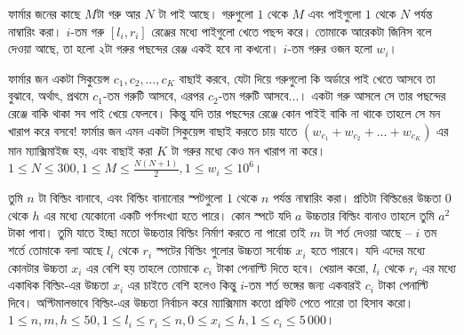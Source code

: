\begin{example}[\href{http://www.usaco.org/index.php?page=viewproblem2&%
  cpid=972}{USACO - Greedy Pie Eaters}]
  ফার্মার জনের কাছে $M$টা গরু আর $N$ টা পাই আছে। গরুগুলো $1$ থেকে $M$ এবং
  পাইগুলো $1$ থেকে $N$ পর্যন্ত নাম্বারিং করা। $i$-তম গরু $[l_i, r_i]$ রেঞ্জের
  মধ্যে পাইগুলো খেতে পছন্দ করে। তোমাকে আরেকটা জিনিস বলে দেওয়া আছে, তা হলো ২টা
  গরুর পছন্দের রেঞ্জ একই হবে না কখনো। $i$-তম গরুর ওজন হলো $w_i$।

  \noindent ফার্মার জন একটা সিকুয়েন্স $c_1, c_2, \ldots, c_K$ বাছাই করবে,
  যেটা দিয়ে গরুগুলো কি অর্ডারে পাই খেতে আসবে তা বুঝাবে, অর্থাৎ, প্রথমে
  $c_1$-তম গরুটি আসবে, এরপর $c_2$-তম গরুটি আসবে...। একটা গরু আসলে সে তার
  পছন্দের রেঞ্জে বাকি থাকা সব পাই খেয়ে ফেলবে। কিন্তু যদি তার পছন্দের রেঞ্জে
  কোন পাইই বাকি না থাকে তাহলে সে মন খারাপ করে বসবে! ফার্মার জন এমন একটা
  সিকুয়েন্স বাছাই করতে চায় যাতে $(w_{c_1} + w_{c_2} + \ldots + w_{c_K})$ এর
  মান ম্যাক্সিমাইজ হয়, এবং বাছাই করা $K$ টা গরুর মধ্যে কেও মন খারাপ না করে।
  $1 \le N \le 300, 1 \le M \le \frac{N(N+1)}{2}, 1 \le w_i \le 10^6$।
\end{example}

\begin{example}
  তুমি $n$ টা বিল্ডিং বানাবে, এবং বিল্ডিং বানানোর স্পটগুলো $1$ থেকে $n$
  পর্যন্ত নাম্বারিং করা। প্রতিটা বিল্ডিঙের উচ্চতা 0 থেকে $h$ এর মধ্যে যেকোনো
  একটি পর্ণসংখ্যা হতে পারে। কোন স্পটে যদি $a$ উচ্চতার বিল্ডিং বানাও তাহলে
  তুমি $a^2$ টাকা পাবা। তুমি যাতে ইচ্ছা মতো উচ্চতার বিল্ডিং নির্মাণ করতে না
  পারো তাই $m$ টা শর্ত দেওয়া আছে -- $i$ তম শর্তে তোমাকে বলা আছে $l_i$ থেকে
  $r_i$ স্পটের বিল্ডিং গুলোর উচ্চতা সর্বোচ্চ $x_i$ হতে পারবে। যদি এদের মধ্যে
  কোনটার উচ্চতা $x_i$ এর বেশি হয় তাহলে তোমাকে $c_i$ টাকা পেনাল্টি দিতে হবে।
  খেয়াল করো, $l_i$ থেকে $r_i$ এর মধ্যে একাধিক বিল্ডিং-এর উচ্চতা $x_i$ এর
  চাইতে বেশি হলেও কিন্তু $i$-তম শর্ত ভঙ্গের জন্য একবারই $c_i$ টাকা পেনাল্টি
  দিবে। অপ্টিমালভাবে বিল্ডিং-এর উচ্চতা নির্বাচন করে ম্যাক্সিমাম কতো প্রফিট
  পেতে পারো তা হিসাব করো। $1 \le n, m, h \le 50, 1 \le l_i \le r_i \le n, 0
  \le x_i \le h, 1 \le c_i \le 5\,000$।
\end{example}

